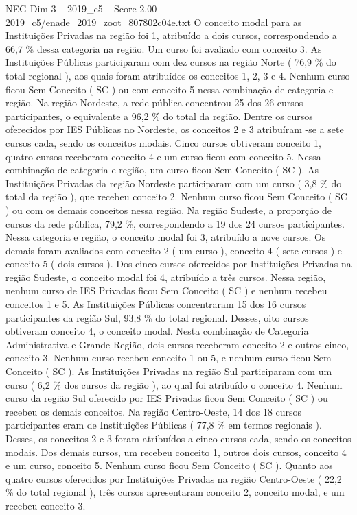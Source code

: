 \begin{textsample}{NEG Dim 3 – 2019\_c5 – Score 2.00 – 2019\_c5/enade\_2019\_zoot\_807802c04e.txt}
O conceito modal para as Instituições Privadas na região foi 1, atribuído a dois cursos, correspondendo a 66,7 \% dessa categoria na região.
Um curso foi avaliado com conceito 3.
As Instituições Públicas participaram com dez cursos na região Norte ( 76,9 \% do total regional ), aos quais foram atribuídos os conceitos 1, 2, 3 e 4.
Nenhum curso ficou Sem Conceito ( SC ) ou com conceito 5 nessa combinação de categoria e região.
Na região Nordeste, a rede pública concentrou 25 dos 26 cursos participantes, o equivalente a 96,2 \% do total da região.
Dentre os cursos oferecidos por IES Públicas no Nordeste, os conceitos 2 e 3 atribuíram -se a sete cursos cada, sendo os conceitos modais.
Cinco cursos obtiveram conceito 1, quatro cursos receberam conceito 4 e um curso ficou com conceito 5.
Nessa combinação de categoria e região, um curso ficou Sem Conceito ( SC ).
As Instituições Privadas da região Nordeste participaram com um curso ( 3,8 \% do total da região ), que recebeu conceito 2.
Nenhum curso ficou Sem Conceito ( SC ) ou com os demais conceitos nessa região.
Na região Sudeste, a proporção de cursos da rede pública, 79,2 \%, correspondendo a 19 dos 24 cursos participantes.
Nessa categoria e região, o conceito modal foi 3, atribuído a nove cursos.
Os demais foram avaliados com conceito 2 ( um curso ), conceito 4 ( sete cursos ) e conceito 5 ( dois cursos ).
Dos cinco cursos oferecidos por Instituições Privadas na região Sudeste, o conceito modal foi 4, atribuído a três cursos.
Nessa região, nenhum curso de IES Privadas ficou Sem Conceito ( SC ) e nenhum recebeu conceitos 1 e 5.
As Instituições Públicas concentraram 15 dos 16 cursos participantes da região Sul, 93,8 \% do total regional.
Desses, oito cursos obtiveram conceito 4, o conceito modal.
Nesta combinação de Categoria Administrativa e Grande Região, dois cursos receberam conceito 2 e outros cinco, conceito 3.
Nenhum curso recebeu conceito 1 ou 5, e nenhum curso ficou Sem Conceito ( SC ).
As Instituições Privadas na região Sul participaram com um curso ( 6,2 \% dos cursos da região ), ao qual foi atribuído o conceito 4.
Nenhum curso da região Sul oferecido por IES Privadas ficou Sem Conceito ( SC ) ou recebeu os demais conceitos.
Na região Centro-Oeste, 14 dos 18 cursos participantes eram de Instituições Públicas ( 77,8 \% em termos regionais ).
Desses, os conceitos 2 e 3 foram atribuídos a cinco cursos cada, sendo os conceitos modais.
Dos demais cursos, um recebeu conceito 1, outros dois cursos, conceito 4 e um curso, conceito 5.
Nenhum curso ficou Sem Conceito ( SC ).
Quanto aos quatro cursos oferecidos por Instituições Privadas na região Centro-Oeste ( 22,2 \% do total regional ), três cursos apresentaram conceito 2, conceito modal, e um recebeu conceito 3.

\end{textsample}
